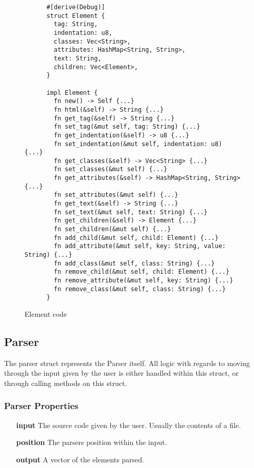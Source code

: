 \begin{figure}[!hbtp]
    \small
    \begin{verbatim}
      #[derive(Debug)]
      struct Element {
        tag: String,
        indentation: u8,
        classes: Vec<String>,
        attributes: HashMap<String, String>,
        text: String,
        children: Vec<Element>,
      }

      impl Element {
        fn new() -> Self {...}
        fn html(&self) -> String {...}
        fn get_tag(&self) -> String {...}
        fn set_tag(&mut self, tag: String) {...}
        fn get_indentation(&self) -> u8 {...}
        fn set_indentation(&mut self, indentation: u8) {...}
        fn get_classes(&self) -> Vec<String> {...}
        fn set_classes(&mut self) {...}
        fn get_attributes(&self) -> HashMap<String, String> {...}
        fn set_attributes(&mut self) {...}
        fn get_text(&self) -> String {...}
        fn set_text(&mut self, text: String) {...}
        fn get_children(&self) -> Element {...}
        fn set_children(&mut self) {...}
        fn add_child(&mut self, child: Element) {...}
        fn add_attribute(&mut self, key: String, value: String) {...}
        fn add_class(&mut self, class: String) {...}
        fn remove_child(&mut self, child: Element) {...}
        fn remove_attribute(&mut self, key: String) {...}
        fn remove_class(&mut self, class: String) {...}
      }
    \end{verbatim}
    \caption{Element code}
\end{figure}

\subsection{Parser}
The parser struct represents the Parser itself. All logic with regards to moving through the input given by the user is either handled within this struct, or through calling methods on this struct.

\subsubsection{Parser Properties}
\begin{itemize}
    \item[\textbf{input}] The source code given by the user. Usually the contents of a file.
    \item[\textbf{position}] The parsers position within the input. 
    \item[\textbf{output}] A vector of the elements parsed.
\end{itemize}

